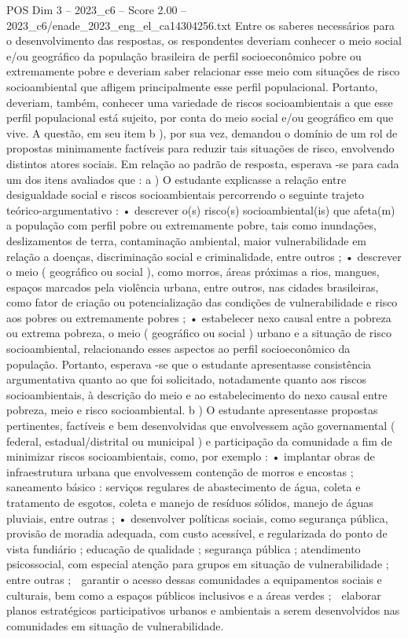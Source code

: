 \begin{textsample}{POS Dim 3 – 2023\_c6 – Score 2.00 – 2023\_c6/enade\_2023\_eng\_el\_ca14304256.txt}
Entre os saberes necessários para o desenvolvimento das respostas, os respondentes deveriam conhecer o meio social e/ou geográfico da população brasileira de perfil socioeconômico pobre ou extremamente pobre e deveriam saber relacionar esse meio com situações de risco socioambiental que afligem principalmente esse perfil populacional.
Portanto, deveriam, também, conhecer uma variedade de riscos socioambientais a que esse perfil populacional está sujeito, por conta do meio social e/ou geográfico em que vive.
A questão, em seu item b ), por sua vez, demandou o domínio de um rol de propostas minimamente factíveis para reduzir tais situações de risco, envolvendo distintos atores sociais.
Em relação ao padrão de resposta, esperava -se para cada um dos itens avaliados que : a ) O estudante explicasse a relação entre desigualdade social e riscos socioambientais percorrendo o seguinte trajeto teórico-argumentativo : • descrever o(s) risco(s) socioambiental(is) que afeta(m) a população com perfil pobre ou extremamente pobre, tais como inundações, deslizamentos de terra, contaminação ambiental, maior vulnerabilidade em relação a doenças, discriminação social e criminalidade, entre outros ; • descrever o meio ( geográfico ou social ), como morros, áreas próximas a rios, mangues, espaços marcados pela violência urbana, entre outros, nas cidades brasileiras, como fator de criação ou potencialização das condições de vulnerabilidade e risco aos pobres ou extremamente pobres ; • estabelecer nexo causal entre a pobreza ou extrema pobreza, o meio ( geográfico ou social ) urbano e a situação de risco socioambiental, relacionando esses aspectos ao perfil socioeconômico da população.
Portanto, esperava -se que o estudante apresentasse consistência argumentativa quanto ao que foi solicitado, notadamente quanto aos riscos socioambientais, à descrição do meio e ao estabelecimento do nexo causal entre pobreza, meio e risco socioambiental. b ) O estudante apresentasse propostas pertinentes, factíveis e bem desenvolvidas que envolvessem ação governamental ( federal, estadual/distrital ou municipal ) e participação da comunidade a fim de minimizar riscos socioambientais, como, por exemplo : • implantar obras de infraestrutura urbana que envolvessem contenção de morros e encostas ; saneamento básico : serviços regulares de abastecimento de água, coleta e tratamento de esgotos, coleta e manejo de resíduos sólidos, manejo de águas pluviais, entre outras ; • desenvolver políticas sociais, como segurança pública, provisão de moradia adequada, com custo acessível, e regularizada do ponto de vista fundiário ; educação de qualidade ; segurança pública ; atendimento psicossocial, com especial atenção para grupos em situação de vulnerabilidade ; entre outras ;  garantir o acesso dessas comunidades a equipamentos sociais e culturais, bem como a espaços públicos inclusivos e a áreas verdes ;  elaborar planos estratégicos participativos urbanos e ambientais a serem desenvolvidos nas comunidades em situação de vulnerabilidade.

\end{textsample}
